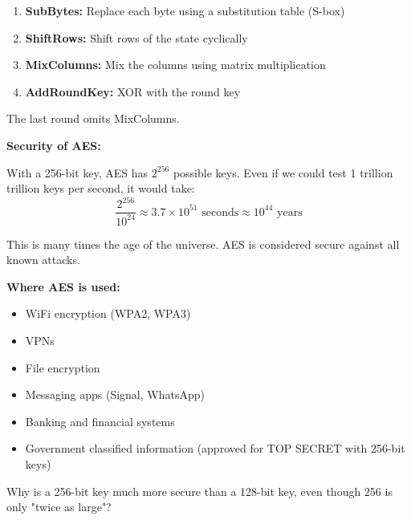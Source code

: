 \documentclass[11pt,a4paper]{report}
\begin{document}
\begin{enumerate}
\item \textbf{SubBytes:} Replace each byte using a substitution table (S-box)
\item \textbf{ShiftRows:} Shift rows of the state cyclically
\item \textbf{MixColumns:} Mix the columns using matrix multiplication
\item \textbf{AddRoundKey:} XOR with the round key
\end{enumerate}

The last round omits MixColumns.

\textbf{Security of AES:}

With a 256-bit key, AES has $2^{256}$ possible keys. Even if we could test 1 trillion trillion keys per second, it would take:
\[ \frac{2^{256}}{10^{24}} \approx 3.7 \times 10^{51} \text{ seconds} \approx 10^{44} \text{ years} \]

This is many times the age of the universe. AES is considered secure against all known attacks.

\textbf{Where AES is used:}
\begin{itemize}
\item WiFi encryption (WPA2, WPA3)
\item VPNs
\item File encryption
\item Messaging apps (Signal, WhatsApp)
\item Banking and financial systems
\item Government classified information (approved for TOP SECRET with 256-bit keys)
\end{itemize}

\begin{ex}
Why is a 256-bit key much more secure than a 128-bit key, even though 256 is only "twice as large"?
\end{ex}
\end{document}

